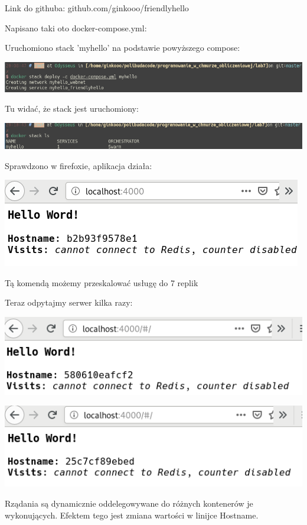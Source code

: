 \documentclass[12pt]{article}
\begin{document}
    Link do githuba: github.com/ginkooo/friendlyhello

    Napisano taki oto docker-compose.yml:

    

    Uruchomiono stack 'myhello' na podstawie powyższego compose:

    \includegraphics[width=\textwidth]{2_2.png}

    Tu widać, że stack jest uruchomiony:

    \includegraphics[width=\textwidth]{2_4.png}

    Sprawdzono w firefoxie, aplikacja działa:

    \includegraphics[width=\textwidth]{2_3.png}

    Tą komendą możemy przeskalować usługę do 7 replik

    Teraz odpytajmy serwer kilka razy:

    \includegraphics[width=\textwidth]{2_10.png}

    \includegraphics[width=\textwidth]{2_11.png}

    Rządania są dynamicznie oddelegowywane do różnych kontenerów je wykonujących. Efektem tego jest zmiana wartości w linijce Hostname.
\end{document}
